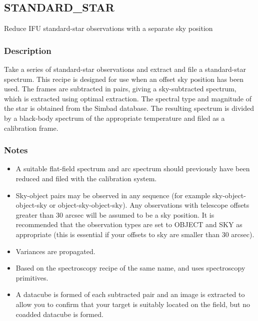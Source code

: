 \documentclass[twoside,11pt,nolof]{starlink}
\begin{document}
\clearpage



\subsection{STANDARD\_STAR}

Reduce IFU standard-star observations with a separate sky position

\subsubsection*{Description}

Take a series of standard-star observations and extract and file a
standard-star spectrum. This recipe is designed for use when an offset
sky position has been used. The frames are subtracted in pairs, giving
a sky-subtracted spectrum, which is extracted using optimal
extraction. The spectral type and magnitude of the star is obtained
from the Simbad database. The resulting spectrum is divided by a
black-body spectrum of the appropriate temperature and filed as a
calibration frame.

\subsubsection*{Notes}\begin{itemize}

\item

  A suitable flat-field spectrum and arc spectrum should previously
  have been reduced and filed with the calibration system.

\item

  Sky-object pairs may be observed in any sequence (for example
  sky-object-object-sky or object-sky-object-sky). Any observations
  with telescope offsets greater than 30 arcsec will be assumed to be
  a sky position. It is recommended that the observation types are set
  to OBJECT and SKY as appropriate (this is essential if your offsets
  to sky are smaller than 30 arcsec).

\item

  Variances are propagated.

\item

  Based on the spectroscopy recipe of the same name, and uses
  spectroscopy primitives.

\item

A datacube is formed of each subtracted pair and an image is extracted
to allow you to confirm that your target is suitably located on the
field, but no coadded datacube is formed.

\end{itemize}
\end{document}

